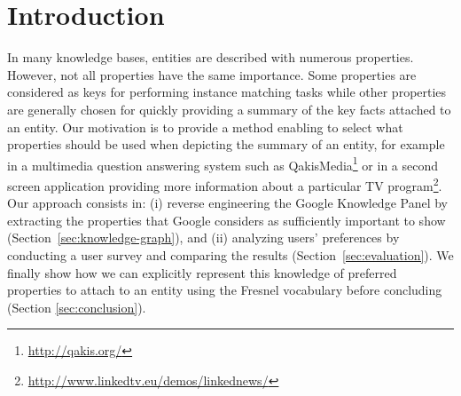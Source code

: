 \documentclass[runningheads,a4paper]{../../Util/LaTEX/llncs}
\begin{document}
\section{Introduction}
\label{sec:introduction}
In many knowledge bases, entities are described with numerous properties. However, not all properties have the same importance. Some properties are considered as keys for performing instance matching tasks while other properties are generally chosen for quickly providing a summary of the key facts attached to an entity. Our motivation is to provide a method enabling to select what properties should be used when depicting the summary of an entity, for example in a multimedia question answering system such as QakisMedia\footnote{\url{http://qakis.org/}} or in a second screen application providing more information about a particular TV program\footnote{\url{http://www.linkedtv.eu/demos/linkednews/}}. Our approach consists in: (i) reverse engineering the Google Knowledge Panel by extracting the properties that Google considers as sufficiently important to show (Section~\ref{sec:knowledge-graph}), and (ii) analyzing users' preferences by conducting a user survey and comparing the results (Section~\ref{sec:evaluation}). We finally show how we can explicitly represent this knowledge of preferred properties to attach to an entity using the Fresnel vocabulary before concluding (Section \ref{sec:conclusion}).
\vspace{-0.4cm}

\end{document}
